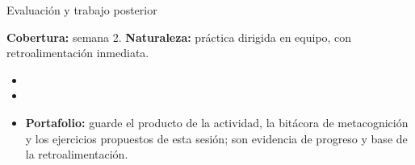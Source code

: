 \documentclass[10pt,aspectratio=169]{beamer}
\begin{document}
\begin{frame}{Evaluación y trabajo posterior}
  \small
  \begin{evalbox}
    \textbf{Cobertura:} semana 2. \textbf{Naturaleza:} práctica dirigida en equipo, con retroalimentación inmediata.
  \end{evalbox}
  \begin{itemize}
    \item \criterios
    \item \declaracionia
    \item \textbf{Portafolio:} guarde el producto de la actividad, la bitácora de metacognición y los ejercicios propuestos de esta sesión; son evidencia de progreso y base de la retroalimentación.
  \end{itemize}
\end{frame}
\end{document}
